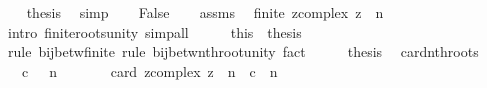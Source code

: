 \begin{isabellebody}
\ \ \isamarkupfalse%
\ {\isacharquery}{\kern0pt}thesis\ \isamarkupfalse%
\ simp\isanewline
{}\isamarkupfalse%
\isanewline
\ \ \isamarkupfalse%
\ False\isanewline
\ \ \isamarkupfalse%
\ assms\ \isamarkupfalse%
\ {\isachardoublequoteopen}finite\ {\isacharbraceleft}{\kern0pt}z{\isacharcolon}{\kern0pt}{\isacharcolon}{\kern0pt}complex{\isachardot}{\kern0pt}\ z\ {\isacharcircum}{\kern0pt}\ n\ {\isacharequal}{\kern0pt}\ {}{\isacharbraceright}{\kern0pt}{\isachardoublequoteclose}\ \isamarkupfalse%
\ {\isacharparenleft}{\kern0pt}intro\ finite{\isacharunderscore}{\kern0pt}roots{\isacharunderscore}{\kern0pt}unity{\isacharparenright}{\kern0pt}\ simp{\isacharunderscore}{\kern0pt}all\isanewline
\ \ \isamarkupfalse%
\ \isamarkupfalse%
\ {\isachardoublequoteopen}{\isacharquery}{\kern0pt}this\ {\isasymlongleftrightarrow}\ {\isacharquery}{\kern0pt}thesis{\isachardoublequoteclose}\isanewline
\ \ \ \ \isamarkupfalse%
\ {\isacharparenleft}{\kern0pt}rule\ bij{\isacharunderscore}{\kern0pt}betw{\isacharunderscore}{\kern0pt}finite{\isacharcomma}{\kern0pt}\ rule\ bij{\isacharunderscore}{\kern0pt}betw{\isacharunderscore}{\kern0pt}nth{\isacharunderscore}{\kern0pt}root{\isacharunderscore}{\kern0pt}unity{\isacharparenright}{\kern0pt}\ fact{\isacharplus}{\kern0pt}\isanewline
\ \ \isamarkupfalse%
\ \isamarkupfalse%
\ {\isacharquery}{\kern0pt}thesis\ \isacommand{{\isachardot}{\kern0pt}}\isamarkupfalse%
\isanewline
{}\isamarkupfalse%
%
\endisatagproof
{\isafoldproof}%
%
\isadelimproof
\isanewline
%
\endisadelimproof
\isanewline
{}\isamarkupfalse%
\ card{\isacharunderscore}{\kern0pt}nth{\isacharunderscore}{\kern0pt}roots{\isacharcolon}{\kern0pt}\isanewline
\ \ \ {\isachardoublequoteopen}c\ {\isasymnoteq}\ {}{\isachardoublequoteclose}\ {\isachardoublequoteopen}n\ {\isachargreater}{\kern0pt}\ {}{\isachardoublequoteclose}\isanewline
\ \ \ \ \ {\isachardoublequoteopen}card\ {\isacharbraceleft}{\kern0pt}z{\isacharcolon}{\kern0pt}{\isacharcolon}{\kern0pt}complex{\isachardot}{\kern0pt}\ z\ {\isacharcircum}{\kern0pt}\ n\ {\isacharequal}{\kern0pt}\ c{\isacharbraceright}{\kern0pt}\ {\isacharequal}{\kern0pt}\ n{\isachardoublequoteclose}\isanewline
%
\isadelimproof
%
\endisadelimproof
%
\isatagproof
{}\isamarkupfalse%
\ {\isacharminus}{\kern0pt}\isanewline
\ \ \isamarkupfalse%

\end{isabellebody}
